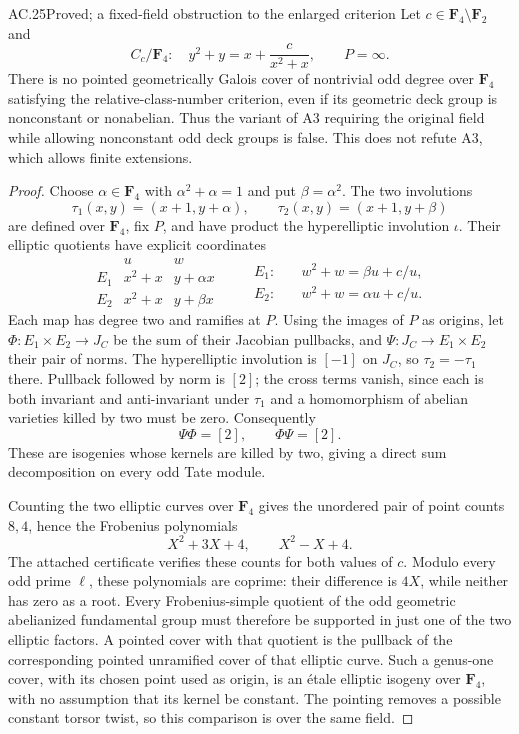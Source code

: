 \begin{claim}{AC.25}{Proved; a fixed-field obstruction to the enlarged criterion}
Let $c\in\mathbf F_4\setminus\mathbf F_2$ and
\[
           C_c/\mathbf F_4:\quad y^2+y=x+\frac{c}{x^2+x},
                   \qquad P=\infty.
\]
There is no pointed geometrically Galois cover of nontrivial odd
degree over $\mathbf F_4$ satisfying the relative-class-number
criterion, even if its geometric deck group is nonconstant or
nonabelian.  Thus the variant of A3 requiring the original field
while allowing nonconstant odd deck groups is false.
This does not refute A3, which allows finite extensions.
\end{claim}
\begin{proof}
Choose $\alpha\in\mathbf F_4$ with $\alpha^2+\alpha=1$ and put
$\beta=\alpha^2$.  The two involutions
\[
  \tau_1(x,y)=(x+1,y+\alpha),\qquad
  \tau_2(x,y)=(x+1,y+\beta)
\]
are defined over $\mathbf F_4$, fix $P$, and have product the
hyperelliptic involution $\iota$.  Their elliptic quotients have
explicit coordinates
\[
 \begin{array}{c|c|c}
 &u&w\\\hline
 E_1&x^2+x&y+\alpha x\\
 E_2&x^2+x&y+\beta x
 \end{array}
 \qquad
 \begin{aligned}
 E_1:&\quad w^2+w=\beta u+c/u,\\
 E_2:&\quad w^2+w=\alpha u+c/u.
 \end{aligned}
\]
Each map has degree two and ramifies at $P$.
Using the images of $P$ as origins, let
$\Phi:E_1\times E_2\to J_C$ be the sum of their Jacobian pullbacks,
and $\Psi:J_C\to E_1\times E_2$ their pair of norms.
The hyperelliptic involution is $[-1]$ on $J_C$, so
$\tau_2=-\tau_1$ there.  Pullback followed by norm is $[2]$;
the cross terms vanish, since each is both invariant and anti-invariant
under $\tau_1$ and a homomorphism of abelian varieties killed by two
must be zero.  Consequently
\[
                   \Psi\Phi=[2],\qquad \Phi\Psi=[2].
\]
These are isogenies whose kernels are killed by two, giving a direct
sum decomposition on every odd Tate module.

Counting the two elliptic curves over $\mathbf F_4$ gives the
unordered pair of point counts $8,4$, hence the Frobenius polynomials
\[
                       X^2+3X+4,\qquad X^2-X+4.
\]
The attached certificate verifies these counts for both values of $c$.
Modulo every odd prime $\ell$, these polynomials are coprime: their
difference is $4X$, while neither has zero as a root.
Every Frobenius-simple quotient of the odd geometric abelianized
fundamental group must therefore be supported in just one of the two
elliptic factors.  A pointed cover with that quotient is the pullback
of the corresponding pointed unramified cover of that elliptic curve.
Such a genus-one cover, with its chosen point used as origin, is an
\'etale elliptic isogeny over $\mathbf F_4$, with no assumption that its
kernel be constant.  The pointing removes a possible constant torsor
twist, so this comparison is over the same field.


\end{proof}
